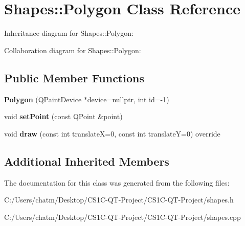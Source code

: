 \hypertarget{class_shapes_1_1_polygon}{}\section{Shapes\+::Polygon Class Reference}
\label{class_shapes_1_1_polygon}


Inheritance diagram for Shapes\+::Polygon\+:


Collaboration diagram for Shapes\+::Polygon\+:
\subsection*{Public Member Functions}
\begin{DoxyCompactItemize}
\item 
\mbox{\label{class_shapes_1_1_polygon_a0d49d7901a71e760dba92e0f5b5478b3}} 
{\bfseries Polygon} (Q\+Paint\+Device $\ast$device=nullptr, int id=-\/1)
\item 
\mbox{\label{class_shapes_1_1_polygon_ad2e32044e1a02641d7acb19234527bab}} 
void {\bfseries set\+Point} (const Q\+Point \&point)
\item 
\mbox{\label{class_shapes_1_1_polygon_a3ae95ecf82745c086bdca93643f13755}} 
void {\bfseries draw} (const int translateX=0, const int translateY=0) override
\end{DoxyCompactItemize}
\subsection*{Additional Inherited Members}


The documentation for this class was generated from the following files\+:\begin{DoxyCompactItemize}
\item 
C\+:/\+Users/chatm/\+Desktop/\+C\+S1\+C-\/\+Q\+T-\/\+Project/\+C\+S1\+C-\/\+Q\+T-\/\+Project/shapes.\+h\item 
C\+:/\+Users/chatm/\+Desktop/\+C\+S1\+C-\/\+Q\+T-\/\+Project/\+C\+S1\+C-\/\+Q\+T-\/\+Project/shapes.\+cpp\end{DoxyCompactItemize}
